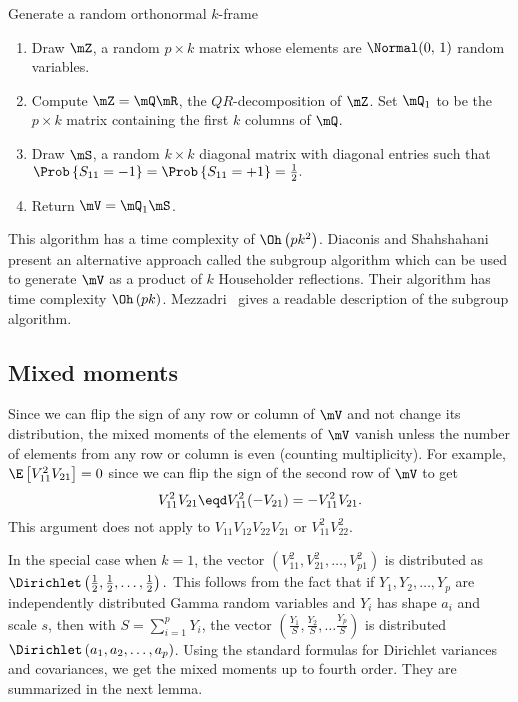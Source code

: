 \begin{algorithm}
    \caption{\label{A:random-steifel}Generate a random orthonormal $k$-frame}
    \begin{enumerate}
        \item Draw $\mZ$, a random $p \times k$ matrix whose elements are 
              \iid $\Normal( 0, \, 1 )$ random variables.
              
        \item Compute $\mZ = \mQ \mR$, the $QR$-decomposition of $\mZ$.
              Set $\mQ_1$ to be the $p \times k$ matrix containing the
              first $k$ columns of $\mQ$.

        \item Draw $\mS$, a random $k \times k$ diagonal matrix with \iid 
              diagonal entries such that 
              \(
                  \Prob\left\{ S_{11} = -1 \right\}
                  =
                  \Prob\left\{ S_{11} = +1 \right\}
                  =
                  \frac{1}{2}.
              \)
        \item Return $\mV = \mQ_1 \mS$.
    \end{enumerate}
\end{algorithm}

\noindent 
This algorithm has a time complexity of $\Oh\left( p k^2 \right)$. Diaconis
and Shahshahani~\cite{diaconis1987sag} present an alternative approach called
the subgroup algorithm which can be used to generate $\mV$ as a product of 
$k$ Householder reflections.  Their algorithm has time complexity 
$\Oh\left( p k \right)$.  Mezzadri~\cite{mezzadri2007grm} gives a readable 
description of the subgroup algorithm.


\subsection{Mixed moments}

Since we can flip the sign of any row or column of $\mV$ and not change
its distribution, the mixed moments of the elements of $\mV$ vanish unless 
the number of elements from any row or column is even (counting multiplicity).  For example, $\E \left[ V_{11}^2 V_{21} \right] = 0$ since we can flip the sign of the second row of $\mV$ to get
\[
    V_{11}^2 V_{21} 
    \eqd
    V_{11}^2 (- V_{21})
    =
    -V_{11}^2 V_{21}.
\]
This argument does not apply to $V_{11} V_{12} V_{22} V_{21}$ or
$V_{11}^2 V_{22}^2$.


In the special case when $k = 1$, the vector
\(
    \left(
        V_{11}^2, V_{21}^2, \ldots, V_{p1}^2
    \right)
\)
is distributed as 
\(
    \Dirichlet\left( \frac{1}{2}, \frac{1}{2}, \ldots, \frac{1}{2} \right).
\)
This follows from the fact that if $Y_1, Y_2, \ldots, Y_p$ are independently distributed Gamma random variables and $Y_i$ has shape
$a_i$ and scale $s$, then with $S = \sum_{i=1}^p Y_i$, the vector
\(
    \left(
        \frac{Y_1}{S},
        \frac{Y_2}{S},
        \ldots
        \frac{Y_p}{S}
    \right)
\)
is distributed $\Dirichlet\left( a_1, a_2, \ldots, a_p \right)$.  Using
the standard formulas for Dirichlet variances and covariances, we get
the mixed moments up to fourth order.  They are summarized in the next
lemma.

